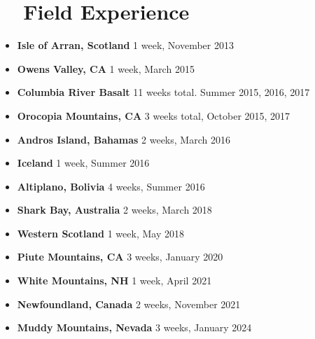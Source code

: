 \documentclass[letterpaper,20pt]{article}
\newcommand{\resumeItem}[2]{
  \item\normalsize{
    \textbf{#1}{ #2 \vspace{-2pt}}
  }
}
\newcommand{\resumeSubItem}[2]{\resumeItem{#1}{#2}\vspace{-3pt}}
\newcommand{\resumeSubHeadingListStart}{\begin{itemize}[leftmargin=*]}
\newcommand{\resumeSubHeadingListEnd}{\end{itemize}}
\begin{document}
\section{~~Field Experience}
  \resumeSubHeadingListStart
    \resumeSubItem{Isle of Arran, Scotland}{1 week, November 2013}
    \resumeSubItem{Owens Valley, CA}{1 week, March 2015}
    \resumeSubItem{Columbia River Basalt}{11 weeks total. Summer 2015, 2016, 2017}
    \resumeSubItem{Orocopia Mountains, CA}{3 weeks total, October 2015, 2017}
    \resumeSubItem{Andros Island, Bahamas}{2 weeks, March 2016}
    \resumeSubItem{Iceland}{1 week, Summer 2016}
    \resumeSubItem{Altiplano, Bolivia}{4 weeks, Summer 2016}
    \resumeSubItem{Shark Bay, Australia}{2 weeks, March 2018}
    \resumeSubItem{Western Scotland}{1 week, May 2018}
    \resumeSubItem{Piute Mountains, CA}{3 weeks, January 2020}
    \resumeSubItem{White Mountains, NH}{1 week, April 2021}
    \resumeSubItem{Newfoundland, Canada}{2 weeks, November 2021}
    \resumeSubItem{Muddy Mountains, Nevada}{3 weeks, January 2024}
    \resumeSubHeadingListEnd
\end{document}

